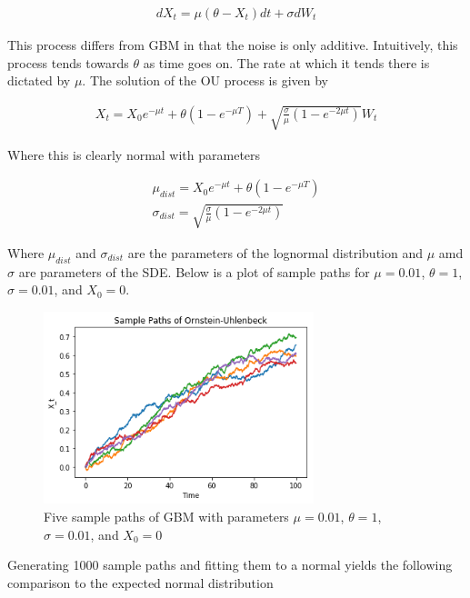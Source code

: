 \documentclass[notitlepage,pra,10pt,aps]{revtex4-2}
\begin{document}
  \begin{gather*}
    d X_t = \mu(\theta-X_t) dt + \sigma dW_t
  \end{gather*}

  This process differs from GBM in that the noise is only additive. Intuitively, this process tends towards $\theta$ as time goes on. The rate at which it tends there is dictated by $\mu$. The solution of the OU process is given by

  \begin{gather*}
    X_t = X_0 e^{-\mu t}+ \theta(1-e^{-\mu T}) + \sqrt{\frac{\sigma}{\mu} (1-e^{-2 \mu t})} W_t
  \end{gather*}

  Where this is clearly normal with parameters

  \begin{gather*}
    \mu_{dist} = X_0 e^{-\mu t}+ \theta(1-e^{-\mu T})  \\
    \sigma_{dist} = \sqrt{\frac{\sigma}{\mu} (1-e^{-2 \mu t})}
  \end{gather*}

  Where $\mu_{dist}$ and $\sigma_{dist}$ are the parameters of the lognormal distribution and $\mu$ amd $\sigma$ are parameters of the SDE. Below is a plot of sample paths for $\mu = 0.01$, $\theta =1$, $\sigma = 0.01$, and $X_0 = 0$.

  \begin{figure}[H]
    \centering
      \includegraphics[width=0.7\textwidth]{sample_paths_ou.png}
    \caption{Five sample paths of GBM with parameters $\mu = 0.01$, $\theta =1$, $\sigma = 0.01$, and $X_0 = 0$}
  \end{figure}

  Generating 1000 sample paths and fitting them to a normal yields the following comparison to the expected normal distribution
\end{document}
